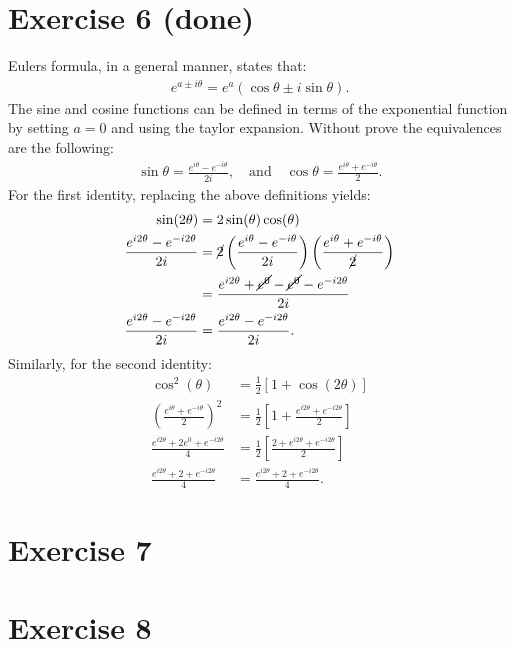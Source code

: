\documentclass[letterpaper,11pt,twoside]{article}
\begin{document}
\section{Exercise 6 (done)}
Eulers formula, in a general manner, states that:
\begin{align}
  e^{a\pm i\theta}=e^{a}(\cos\theta\pm i\sin\theta).
\end{align}
The sine and cosine functions can be defined in terms of the exponential function by setting $a=0$ and using the taylor expansion.
Without prove the equivalences are the following:
\begin{align*}
  \sin\theta=\frac{e^{i\theta}-e^{-i\theta}}{2i},\quad\text{and}\quad\cos\theta=\frac{e^{i\theta}+e^{-i\theta}}{2}.
\end{align*}
For the first identity, replacing the above definitions yields:
\begin{align*}
  \sin(2\theta)&=2\sin(\theta)\cos(\theta)\\
  \frac{e^{i2\theta}-e^{-i2\theta}}{2i}&=\cancel{2}\left(\frac{e^{i\theta}-e^{-i\theta}}{2i}\right)\left(\frac{e^{i\theta}+e^{-i\theta}}{\cancel{2}}\right)\\
  &=\frac{e^{i2\theta}+\cancel{e^0}-\cancel{e^{0}}-e^{-i2\theta}}{2i}\\
  \frac{e^{i2\theta}-e^{-i2\theta}}{2i}&=\frac{e^{i2\theta}-e^{-i2\theta}}{2i}.
\end{align*}
Similarly, for the second identity:
\begin{align*}
  \cos^2(\theta)&=\frac{1}{2}[1+\cos(2\theta)]\\
  \left(\frac{e^{i\theta}+e^{-i\theta}}{2}\right)^2&=\frac{1}{2}\left[1+\frac{e^{i2\theta}+e^{-i2\theta}}{2}\right]\\
  \frac{e^{i2\theta}+2e^{0}+e^{-i2\theta}}{4}&=\frac{1}{2}\left[\frac{2+e^{i2\theta}+e^{-i2\theta}}{2}\right]\\
  \frac{e^{i2\theta}+2+e^{-i2\theta}}{4}&=\frac{e^{i2\theta}+2+e^{-i2\theta}}{4}.
\end{align*}
\section{Exercise 7}

\section{Exercise 8}
\end{document}
